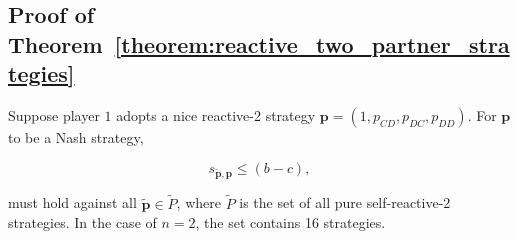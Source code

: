 \documentclass[11pt]{article}
\theoremstyle{plainCl1}
\theoremstyle{plainCl2}
\begin{document}

\subsection{Proof of Theorem~\ref{theorem:reactive_two_partner_strategies}}\label{appendix:reactive_two_pure_self_reactive}

Suppose player $1$ adopts a nice reactive-2 strategy
$\mathbf{p}\!=\!(1, p_{CD}, p_{DC}, p_{DD})$. For $\mathbf{p}$ to be a Nash
strategy,

\begin{equation*}
  s_{\mathbf{\tilde{p}}, \mathbf{p}} \leq (b - c),
\end{equation*}

must hold against all \(\mathbf{\tilde{p}} \in \tilde{P}\), where \(\tilde{P}\) is the
set of all pure self-reactive-2 strategies. In the case of $n=2$, the set
contains 16 strategies.
\end{document}
